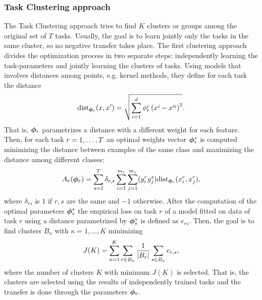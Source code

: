 \subsubsection*{Task Clustering approach}
The Task Clustering approach tries to find $K$ clusters or groups among the original set of $T$ tasks. Usually, the goal is to learn jointly only the tasks in the same cluster, so no negative transfer takes place.
The first clustering approach~\cite{ThrunO96} divides the optimization process in two separate steps: independently learning the task-parameters and jointly learning the clusters of tasks.
Using models that involves distances among points, e.g. kernel methods, they define for each task the distance
$$ \text{dist}_{\bm{\phi}_r}(x, x') = \sqrt{\sum_{i=1}^d \phi_r^i \left( x^i - x'^i \right)^2}. $$
That is, $\bm{\phi}_r$ parametrizes a distance with a different weight for each feature.
Then, for each task $r=1, \ldots, T$ an optimal weights vector $\bm{\phi}_r^*$ is computed minimizing the distance between examples of the same class and maximizing the distance among different classes:
\begin{equation}
    \nonumber
    A_r(\bm{\phi}_r) = \sum_{s=1}^T \delta_{r, s} \sum_{i=1}^{m_r} \sum_{j=1}^{m_s} (y_i^r  y_j^s)  \text{dist}_{\bm{\phi}_r}(x_i^r, x_j^r),
\end{equation}
where $\delta_{rs}$ is $1$ if $r,s$ are the same and $-1$ otherwise.
After the computation of the optimal parameters $\bm{\phi}_r^*$ the empirical loss on task $r$ of a model fitted on data of task $r$ using a distance parametrized by $\bm{\phi}_s^*$ is defined as $e_{rs}$. Then, the goal is to find clusters $B_\kappa$ with $\kappa=1, \ldots, K$ minimizing
\begin{equation}
    \nonumber
    J(K) = \sum_{\kappa = 1}^K \sum_{r \in B_\kappa} \frac{1}{\left|B_r\right|} \sum_{s \in B_\kappa} e_{r, s} ,
\end{equation}
where the number of clusters $K$ with minimum $J(K)$ is selected. That is, the clusters are selected using the results of independently trained tasks and the transfer is done through the parameters $\bm{\phi}_r$.
%
%

